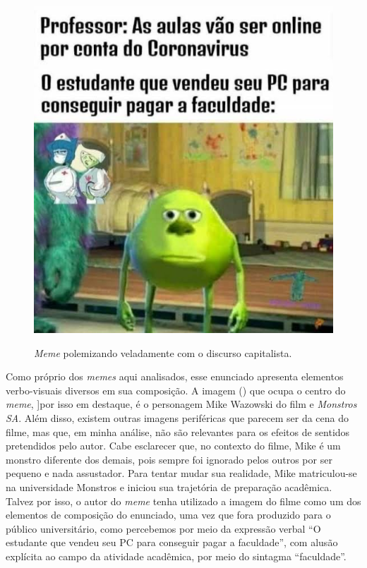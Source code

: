 \documentclass[portuguese]{textolivre}
\begin{document}
\begin{figure}[h!]
\centering
\begin{minipage}{.8\textwidth}
\includegraphics[width=\textwidth]{a46126Texto20do20artigo1489961706781120230920-img001.jpg}
\caption{\textit{Meme} polemizando veladamente com o discurso capitalista.}
\label{fig:fig1}
\end{minipage}
\end{figure}

Como próprio dos \textit{memes} aqui analisados, esse enunciado apresenta elementos verbo-visuais diversos em sua composição. A imagem () que ocupa o centro do \textit{meme}, ]por isso em destaque, é o personagem Mike Wazowski do film e \textit{Monstros SA}. Além disso, existem outras imagens periféricas que parecem ser da cena do filme, mas que, em minha análise, não são relevantes para os efeitos de sentidos pretendidos pelo autor. Cabe esclarecer que, no contexto do filme, Mike é um monstro diferente dos demais, pois sempre foi ignorado pelos outros por ser pequeno e nada assustador. Para tentar mudar sua realidade, Mike matriculou-se na universidade Monstros e iniciou sua trajetória de preparação acadêmica. Talvez por isso, o autor do \textit{meme} tenha utilizado a imagem do filme como um dos elementos de composição do enunciado, uma vez que fora produzido para o público universitário, como percebemos por meio da expressão verbal “O estudante que vendeu seu PC para conseguir pagar a faculdade”, com alusão explícita ao campo da atividade acadêmica, por meio do sintagma “faculdade”.
	
\end{document}
